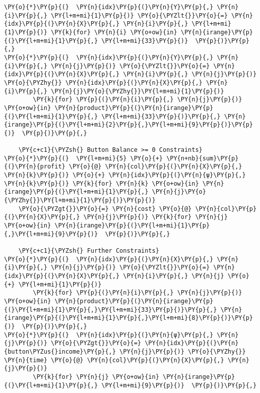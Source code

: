 \begin{tcolorbox}[breakable, size=fbox, boxrule=1pt, pad at break*=1mm,colback=cellbackground, colframe=cellborder]
\begin{Verbatim}[commandchars=\\\{\}]
\PY{o}{*}\PY{p}{(}  \PY{n}{idx}\PY{p}{(}\PY{n}{Y}\PY{p}{,} \PY{n}{i}\PY{p}{,} \PY{l+m+mi}{1}\PY{p}{)} \PY{o}{\PYZlt{}}\PY{o}{=} \PY{n}{idx}\PY{p}{(}\PY{n}{X}\PY{p}{,} \PY{n}{i}\PY{p}{,} \PY{l+m+mi}{1}\PY{p}{)} \PY{k}{for} \PY{n}{i} \PY{o+ow}{in} \PY{n}{irange}\PY{p}{(}\PY{l+m+mi}{1}\PY{p}{,} \PY{l+m+mi}{33}\PY{p}{)}  \PY{p}{)}\PY{p}{,}
\PY{o}{*}\PY{p}{(}  \PY{n}{idx}\PY{p}{(}\PY{n}{Y}\PY{p}{,} \PY{n}{i}\PY{p}{,} \PY{n}{j}\PY{p}{)} \PY{o}{\PYZlt{}}\PY{o}{=} \PY{n}{idx}\PY{p}{(}\PY{n}{X}\PY{p}{,} \PY{n}{i}\PY{p}{,} \PY{n}{j}\PY{p}{)} \PY{o}{\PYZhy{}} \PY{n}{idx}\PY{p}{(}\PY{n}{X}\PY{p}{,} \PY{n}{i}\PY{p}{,} \PY{n}{j}\PY{o}{\PYZhy{}}\PY{l+m+mi}{1}\PY{p}{)}
        \PY{k}{for} \PY{p}{(}\PY{n}{i}\PY{p}{,} \PY{n}{j}\PY{p}{)} \PY{o+ow}{in} \PY{n}{product}\PY{p}{(}\PY{n}{irange}\PY{p}{(}\PY{l+m+mi}{1}\PY{p}{,} \PY{l+m+mi}{33}\PY{p}{)}\PY{p}{,} \PY{n}{irange}\PY{p}{(}\PY{l+m+mi}{2}\PY{p}{,}\PY{l+m+mi}{9}\PY{p}{)}\PY{p}{)}  \PY{p}{)}\PY{p}{,}

    \PY{c+c1}{\PYZsh{} Button Balance >= 0 Constraints}
\PY{o}{*}\PY{p}{(}  \PY{l+m+mi}{5} \PY{o}{+} \PY{n+nb}{sum}\PY{p}{(}\PY{n}{profit} \PY{o}{@} \PY{n}{col}\PY{p}{(}\PY{n}{X}\PY{p}{,} \PY{n}{k}\PY{p}{)} \PY{o}{+} \PY{n}{idx}\PY{p}{(}\PY{n}{ψ}\PY{p}{,} \PY{n}{k}\PY{p}{)} \PY{k}{for} \PY{n}{k} \PY{o+ow}{in} \PY{n}{irange}\PY{p}{(}\PY{l+m+mi}{1}\PY{p}{,} \PY{n}{j}\PY{o}{\PYZhy{}}\PY{l+m+mi}{1}\PY{p}{)}\PY{p}{)}
    \PY{o}{\PYZgt{}}\PY{o}{=} \PY{n}{cost} \PY{o}{@} \PY{n}{col}\PY{p}{(}\PY{n}{X}\PY{p}{,} \PY{n}{j}\PY{p}{)} \PY{k}{for} \PY{n}{j} \PY{o+ow}{in} \PY{n}{irange}\PY{p}{(}\PY{l+m+mi}{1}\PY{p}{,}\PY{l+m+mi}{9}\PY{p}{)}  \PY{p}{)}\PY{p}{,}

    \PY{c+c1}{\PYZsh{} Further Constraints}
\PY{o}{*}\PY{p}{(}  \PY{n}{idx}\PY{p}{(}\PY{n}{X}\PY{p}{,} \PY{n}{i}\PY{p}{,} \PY{n}{j}\PY{p}{)} \PY{o}{\PYZlt{}}\PY{o}{=} \PY{n}{idx}\PY{p}{(}\PY{n}{X}\PY{p}{,} \PY{n}{i}\PY{p}{,} \PY{n}{j} \PY{o}{+} \PY{l+m+mi}{1}\PY{p}{)}
        \PY{k}{for} \PY{p}{(}\PY{n}{i}\PY{p}{,} \PY{n}{j}\PY{p}{)} \PY{o+ow}{in} \PY{n}{product}\PY{p}{(}\PY{n}{irange}\PY{p}{(}\PY{l+m+mi}{1}\PY{p}{,}\PY{l+m+mi}{33}\PY{p}{)}\PY{p}{,} \PY{n}{irange}\PY{p}{(}\PY{l+m+mi}{1}\PY{p}{,}\PY{l+m+mi}{8}\PY{p}{)}\PY{p}{)}  \PY{p}{)}\PY{p}{,}
\PY{o}{*}\PY{p}{(}  \PY{n}{idx}\PY{p}{(}\PY{n}{ψ}\PY{p}{,} \PY{n}{j}\PY{p}{)} \PY{o}{\PYZgt{}}\PY{o}{=} \PY{n}{idx}\PY{p}{(}\PY{n}{button\PYZus{}income}\PY{p}{,} \PY{n}{j}\PY{p}{)} \PY{o}{\PYZhy{}} \PY{n}{time} \PY{o}{@} \PY{n}{col}\PY{p}{(}\PY{n}{X}\PY{p}{,} \PY{n}{j}\PY{p}{)}
        \PY{k}{for} \PY{n}{j} \PY{o+ow}{in} \PY{n}{irange}\PY{p}{(}\PY{l+m+mi}{1}\PY{p}{,} \PY{l+m+mi}{9}\PY{p}{)}  \PY{p}{)}\PY{p}{,}


\end{Verbatim}
\end{tcolorbox}
